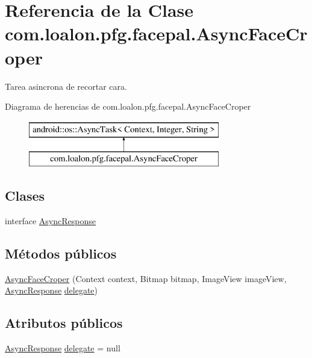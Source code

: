 \hypertarget{classcom_1_1loalon_1_1pfg_1_1facepal_1_1_async_face_croper}{}\section{Referencia de la Clase com.\+loalon.\+pfg.\+facepal.\+Async\+Face\+Croper}
\label{classcom_1_1loalon_1_1pfg_1_1facepal_1_1_async_face_croper}


Tarea asincrona de recortar cara.  


Diagrama de herencias de com.\+loalon.\+pfg.\+facepal.\+Async\+Face\+Croper\begin{figure}[H]
\begin{center}
\leavevmode
\includegraphics[height=2.000000cm]{classcom_1_1loalon_1_1pfg_1_1facepal_1_1_async_face_croper}
\end{center}
\end{figure}
\subsection*{Clases}
\begin{DoxyCompactItemize}
\item 
interface \mbox{\hyperlink{interfacecom_1_1loalon_1_1pfg_1_1facepal_1_1_async_face_croper_1_1_async_response}{Async\+Response}}
\end{DoxyCompactItemize}
\subsection*{Métodos públicos}
\begin{DoxyCompactItemize}
\item 
\mbox{\hyperlink{classcom_1_1loalon_1_1pfg_1_1facepal_1_1_async_face_croper_a3edb3637aee55bd3d224ff23dc9652d8}{Async\+Face\+Croper}} (Context context, Bitmap bitmap, Image\+View image\+View, \mbox{\hyperlink{interfacecom_1_1loalon_1_1pfg_1_1facepal_1_1_async_face_croper_1_1_async_response}{Async\+Response}} \mbox{\hyperlink{classcom_1_1loalon_1_1pfg_1_1facepal_1_1_async_face_croper_a11ee69c0d77c5662fb576d1a1547ca83}{delegate}})
\end{DoxyCompactItemize}
\subsection*{Atributos públicos}
\begin{DoxyCompactItemize}
\item 
\mbox{\hyperlink{interfacecom_1_1loalon_1_1pfg_1_1facepal_1_1_async_face_croper_1_1_async_response}{Async\+Response}} \mbox{\hyperlink{classcom_1_1loalon_1_1pfg_1_1facepal_1_1_async_face_croper_a11ee69c0d77c5662fb576d1a1547ca83}{delegate}} = null
\end{DoxyCompactItemize}
